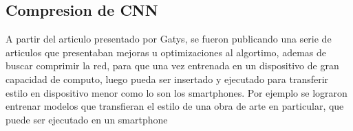 \documentclass[a4paper,11pt,spanish]{book}
\begin{document}
    \subsection{Compresion de CNN}
      A partir del articulo presentado por Gatys, se fueron publicando una serie de articulos que presentaban mejoras u optimizaciones al algortimo, ademas de buscar comprimir la red,
      para que una vez entrenada en un dispositivo de gran capacidad de computo, luego pueda ser insertado y ejecutado para transferir estilo en dispositivo menor como lo son los smartphones.
      Por ejemplo se lograron entrenar modelos que transfieran el estilo de una obra de arte en particular, que puede ser ejecutado en un smartphone
\printindex

\end{document}
